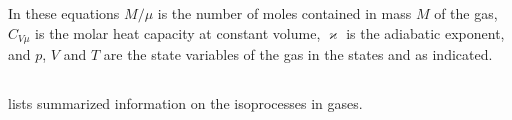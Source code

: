 In these equations $M/\mu$ is the number of moles contained in mass $M$ of the gas, $C_{V\mu}$ is the molar heat capacity at constant volume, $\varkappa$ is the adiabatic exponent, and $p$, $V$ and $T$ are the state variables of the gas in the states  and  as indicated.

\subsection{}\label{9.5.13}  lists summarized information on the isoprocesses in gases.

\clearpage

